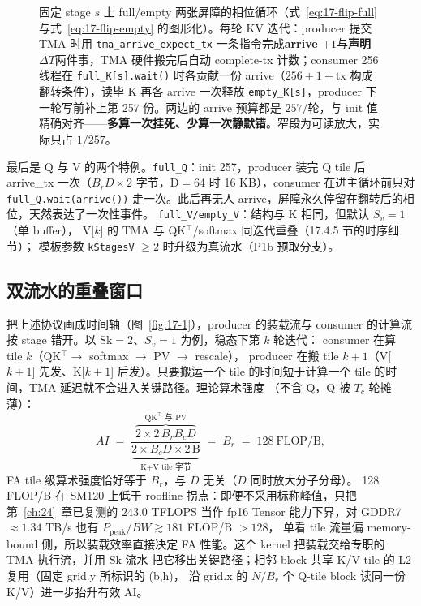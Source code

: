 \begin{figure}[H]
\caption{固定 stage $s$ 上 full/empty 两张屏障的相位循环（式~\ref{eq:17-flip-full} 与式~\ref{eq:17-flip-empty} 的图形化）。每轮 KV 迭代：producer 提交 TMA 时用 \texttt{tma\_arrive\_expect\_tx} 一条指令完成\textbf{arrive $+1$}与\textbf{声明 $\Delta T$}两件事，TMA 硬件搬完后自动 complete-tx 计数；consumer 256 线程在 \texttt{full\_K[s].wait()} 时各贡献一份 arrive（$256+1+\text{tx}$ 构成翻转条件），读毕 K 再各 arrive 一次释放 \texttt{empty\_K[s]}，producer 下一轮写前补上第 257 份。两边的 arrive 预算都是 $257$/轮，与 init 值精确对齐——\textbf{多算一次挂死、少算一次静默错}。窄段为可读放大，实际只占 $1/257$。}
\label{fig:17-arrive-cycle}
\end{figure}

最后是 Q 与 V 的两个特例。\texttt{full\_Q}：init 257，producer 装完
Q tile 后 arrive\_tx 一次（$B_r D \times 2$ 字节，D$=$64 时 16 KB），consumer
在进主循环前只对 \texttt{full\_\allowbreak{}Q.\allowbreak{}wait\allowbreak{}(arrive\allowbreak{}())} 走一次。此后再无人
arrive，屏障永久停留在翻转后的相位，天然表达了一次性事件。
\texttt{full\_\allowbreak{}V/\allowbreak{}empty\_\allowbreak{}V}：结构与 K 相同，但默认 $S_v = 1$（单 buffer），
V[$k$] 的 TMA 与 QK$^\top$/softmax 同迭代重叠（17.4.5 节的时序细节）；
模板参数 \texttt{kStagesV} $\ge 2$ 时升级为真流水（P1b 预取分支）。

\subsection{双流水的重叠窗口}

把上述协议画成时间轴（图~\ref{fig:17-1}），producer 的装载流与 consumer 的计算流
按 stage 错开。以 $\mathrm{Sk} = 2$、$S_v = 1$ 为例，稳态下第 $k$ 轮迭代：
consumer 在算 tile $k$（QK$^\top \to$ softmax $\to$ PV $\to$ rescale），
producer 在搬 tile $k{+}1$（V[$k{+}1$] 先发、K[$k{+}1$] 后发）。只要搬运一个
tile 的时间短于计算一个 tile 的时间，TMA 延迟就不会进入关键路径。理论算术强度
（不含 Q，Q 被 $T_c$ 轮摊薄）：
\begin{equation}
  AI \;=\; \frac{\overbrace{2 \times 2\, B_r B_c D}^{\text{QK}^\top\text{ 与 PV}}}
  {\underbrace{2 \times B_c D \times 2\,\mathrm{B}}_{\text{K+V tile 字节}}}
  \;=\; B_r \;=\; 128 \ \mathrm{FLOP/B} ,
  \label{eq:17-ai}
\end{equation}
FA tile 级算术强度恰好等于 $B_r$，与 $D$ 无关（$D$ 同时放大分子分母）。
128 FLOP/B 在 SM120 上低于 roofline 拐点：即便不采用标称峰值，只把
第~\ref{ch:24}~章已复测的 $243.0$ TFLOPS 当作 fp16 Tensor 能力下界，对
GDDR7 $\approx 1.34$ TB/s 也有 $P_{\mathrm{peak}}/BW \gtrsim 181$ FLOP/B $>128$，
单看 tile 流量偏 memory-bound 侧，所以装载效率直接决定 FA 性能。这个 kernel 把装载交给专职的 TMA 执行流，并用 Sk 流水
把它移出关键路径；相邻 block 共享 K/V tile 的 L2 复用（固定 grid.y 所标识的 (b,h)，
沿 grid.x 的 $N/B_r$ 个 Q-tile block 读同一份 K/V）进一步抬升有效 AI。

